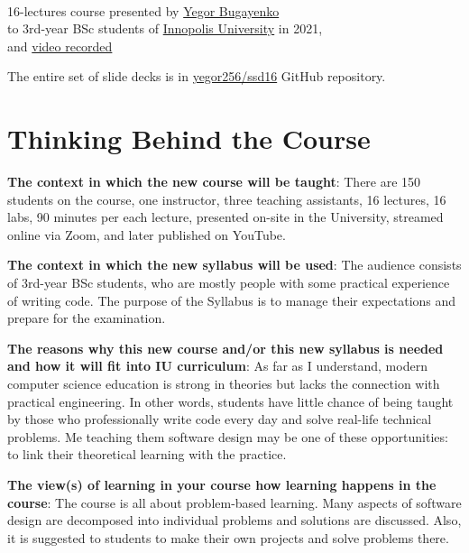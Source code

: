 \documentclass[nobrand,anonymous,nodate,nosecurity]{huawei}
\begin{document}
{\\
16-lectures course presented by \href{https://www.yegor256.com}{Yegor Bugayenko}\\
to 3rd-year BSc students of \href{https://innopolis.university/en/}{Innopolis University} in 2021,\\
and \href{https://www.youtube.com/playlist?list=PLaIsQH4uc08woJKRAA7mmjs9fU0jeKjjM}{video recorded}}

The entire set of slide decks is in \href{https://github.com/yegor256/ssd16}{yegor256/ssd16} GitHub repository.

\section*{Thinking Behind the Course}

\newpage
\textbf{The context in which the new course will be taught}:
There are 150 students on the course, one instructor, three teaching assistants,
16 lectures, 16 labs, 90 minutes per each lecture, presented on-site in the
University, streamed online via Zoom, and later published on YouTube.

\newpage
\textbf{The context in which the new syllabus will be used}:
The audience consists of 3rd-year BSc students, who are mostly people with some
practical experience of writing code. The purpose of the Syllabus is to
manage their expectations and prepare for the examination.

\newpage
\textbf{The reasons why this new course and/or this new syllabus is needed and how it will fit into IU curriculum}:
As far as I understand, modern computer science education is strong in theories
but lacks the connection with practical engineering. In other words, students
have little chance of being taught by those who professionally write code every
day and solve real-life technical problems. Me teaching them software design
may be one of these opportunities: to link their theoretical learning with
the practice.

\newpage
\textbf{The view(s) of learning in your course how learning happens in the course}:
The course is all about problem-based learning. Many aspects of software design
are decomposed into individual problems and solutions are discussed. Also, it
is suggested to students to make their own projects and solve problems there.
\end{document}
